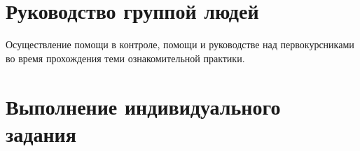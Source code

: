 \documentclass[a4paper, 12pt]{article}
\begin{document}
\section{Руководство группой людей}
Осуществление помощи в контроле, помощи и руководстве над первокурсниками во время прохождения теми ознакомительной практики.

\section{Выполнение индивидуального задания}
\end{document}
